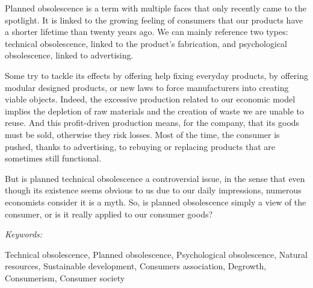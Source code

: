 Planned obsolescence is a term with multiple faces that only recently came to the spotlight. It is linked to the growing feeling of consumers that our products have a shorter lifetime than twenty years ago. We can mainly reference two types: technical obsolescence, linked to the product’s fabrication, and psychological obsolescence, linked to advertising.

Some try to tackle its effects by offering help fixing everyday products, by offering modular designed products, or new laws to force manufacturers into creating viable objects. Indeed, the excessive production related to our economic model implies the depletion of raw materials and the creation of waste we are unable to reuse. And this profit-driven production means, for the company, that its goods must be sold, otherwise they risk losses. Most of the time, the consumer is pushed, thanks to advertising, to rebuying or replacing products that are sometimes still functional.

But is planned technical obsolescence a controversial issue, in the sense that even though its existence seems obvious to us due to our daily impressions, numerous economists consider it is a myth. So, is planned obsolescence simply a view of the consumer, or is it really applied to our consumer goods?

\vspace{2\baselineskip}

\begin{large}\emph{Keywords:} \end{large} Technical obsolescence, Planned obsolescence, Psychological obsolescence, Natural resources, Sustainable development, Consumers association, Degrowth, Consumerism, Consumer society